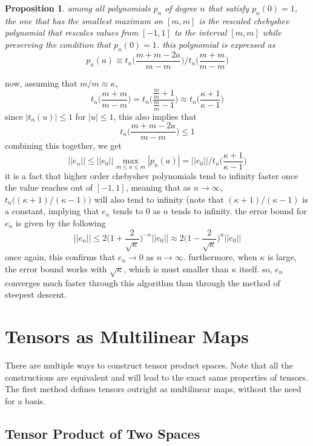\documentclass{article}
\newtheorem{proposition}[theorem]{Proposition}
\theoremstyle{remark}
\theoremstyle{definition}
\begin{document}
    \begin{proposition}
    among all polynomials $p_n$ of degree $n$ that satisfy $p_n (0) = 1$, the one that has the smallest maximum on $[m, m]$ is the \textit{rescaled chebyshev polynomial} that rescales values from $[-1, 1]$ to the interval $[m, m]$ while preserving the condition that $p_n (0) = 1$. this polynomial is expressed as
    \[p_n (a) \equiv t_n \bigg( \frac{m+m-2a}{m-m} \bigg) \bigg/ t_n \bigg(\frac{m+m}{m-m} \bigg)\]
    \end{proposition} 
    now, assuming that $m/m \approx \kappa$, 
    \[t_n \bigg( \frac{m+m}{m-m} \bigg) = t_n \bigg(\frac{\frac{m}{m} + 1}{\frac{m}{m}-1} \bigg) \approx t_n \bigg(\frac{\kappa + 1}{\kappa - 1} \bigg)\]
    since $|t_n (u)| \leq 1$ for $|u| \leq 1$, this also implies that
    \[t_n \bigg( \frac{m + m - 2a}{m-m} \bigg) \leq 1\]
    combining this together, we get
    \[||e_n|| \leq ||e_0|| \max_{m \leq a \leq m} |p_n (a)| = ||e_0|| \bigg/ t_n \bigg( \frac{\kappa+1}{\kappa-1} \bigg)\]
    it is a fact that higher order chebyshev polynomials tend to infinity faster once the value reaches out of $[-1, 1]$, meaning that as $n \rightarrow \infty$, $t_n\big( (\kappa+1)/(\kappa-1)\big)$ will also tend to infinity (note that $(\kappa+1)/(\kappa-1)$ is a constant, implying that $e_n$ tends to $0$ as $n$ tends to infinity. the error bound for $e_n$ is given by the following 
    \[||e_n|| \leq 2 \bigg( 1 + \frac{2}{\sqrt{\kappa}} \bigg)^{-n} ||e_0|| \approx 2 \bigg( 1 - \frac{2}{\sqrt{\kappa}} \bigg)^{n} ||e_0||\]
    once again, this confirms that $e_n \rightarrow 0$ as $n \rightarrow \infty$. furthermore, when $\kappa$ is large, the error bound works with $\sqrt{\kappa}$, which is must smaller than $\kappa$ itself. so, $e_n$ converges much faster through this algorithm than through the method of steepest descent. 

\section{Tensors as Multilinear Maps}

  There are multiple ways to construct tensor product spaces. Note that all the constructions are equivalent and will lead to the exact same properties of tensors. The first method defines tensors outright as multilinear maps, without the need for a basis. 

  \subsection{Tensor Product of Two Spaces}
\end{document}
